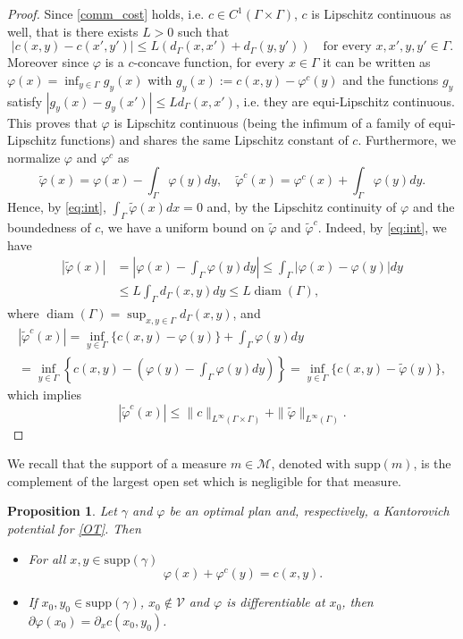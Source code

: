 \documentclass[smallextended,referee,envcountsect,]{svjour3}
\newcommand{\cM}{{\mathcal M}}
\newcommand{\cV}{{\mathcal V}}
\renewcommand{\phi}{\varphi}
\newcommand{\supp}{\mathrm{supp}}
\newtheorem{prop}[theo]{\bf Proposition}
\begin{document}
\begin{proof}
Since \eqref{comm_cost} holds, i.e. $c\in C^1(\Gamma\times\Gamma)$, $c$ is Lipschitz continuous as well, that is there exists $L>0$ such that
$$
|c(x, y)-c(x', y')|\leq L(d_{\Gamma}(x, x')+d_{\Gamma}(y, y'))\quad\text{for every }x,x',y,y'\in\Gamma.
$$
Moreover since $\phi$ is a $c$-concave function, for every $x\in\Gamma$ it can be written as $\phi(x)=\inf_{y\in\Gamma}g_y(x)$ with $g_y(x):=c(x, y)-\phi^c(y)$ and the functions $g_y$ satisfy
$|g_y(x)-g_y(x')|\leq Ld_{\Gamma}(x, x')$, i.e. they are equi-Lipschitz continuous. This proves that $\phi$ is Lipschitz continuous (being the infimum of a family of equi-Lipschitz functions) and shares the same Lipschitz constant of $c$. Furthermore, we normalize $\phi$ and $\phi^c$ as
$$
\tilde\phi(x)=\phi(x)- \int_{\Gamma}\phi(y)dy,\quad\tilde\phi^c(x)=\phi^c(x)+\int_{\Gamma}\phi(y)dy.
$$
Hence, by \eqref{eq:int}, $\int_\Gamma\tilde\phi(x)dx=0$ and, by the Lipschitz continuity of $\phi$ and the boundedness of $c$, we have a uniform bound on $\tilde\phi$ and $\tilde\phi^c$. Indeed, by \eqref{eq:int}, we have
\begin{align*}	
 |\tilde\phi(x)|&=\left|\phi(x)-   \int_{\Gamma}\phi(y)dy\right|\leq \int_{\Gamma}|\phi(x)-\phi(y)|dy\\
&\leq   L\int_{\Gamma}d_{\Gamma}(x, y)dy\leq L\operatorname{diam}(\Gamma),
\end{align*}
where $\operatorname{diam}(\Gamma)= \sup_{x,y\in \Gamma}d_\Gamma (x,y)$, and
\begin{multline*}
|\tilde\phi^c(x)|=\inf_{y\in\Gamma}\{c(x, y)-\phi(y)\}+ \int_{\Gamma}\phi(y)dy\\
=\inf_{y\in\Gamma}\left\{c(x, y)-\left(\phi(y)- \int_{\Gamma}\phi(y)dy\right)\right\}=\inf_{y\in\Gamma}\{c(x, y)-\tilde\phi(y)\},
\end{multline*}
which implies
$$
|\tilde\phi^c(x)|\leq\|c\|_{L^{\infty}(\Gamma\times\Gamma)}+\|\tilde\phi\|_{L^{\infty}(\Gamma)}.
$$
\end{proof}
We recall that the support of a measure $m \in\cM$, denoted with $\supp(m)$, is the complement of the largest open set which is negligible for that measure.
\begin{prop}	\label{optimaltransportnetwork1}
Let $\gamma$  and  $\phi$  be an optimal   plan  and, respectively, a Kantorovich potential for \eqref{OT}. Then 
	  \begin{itemize}
	  	\item[$(i)$] For all $x, y\in\supp(\gamma)$
	  	\begin{equation}\label{kant-rub2}
	  		\phi(x)+\phi^c(y)=c(x, y) .
	  	\end{equation}
	  	\item [$(ii)$] If  $x_0, y_0\in \supp(\gamma)$, $x_0\not\in \cV$ and 
	  	$\phi$ is differentiable at $x_0$, then $\partial\phi(x_0)=\partial_xc(x_0, y_0)$.
	  \end{itemize} 
\end{prop}
\end{document}
